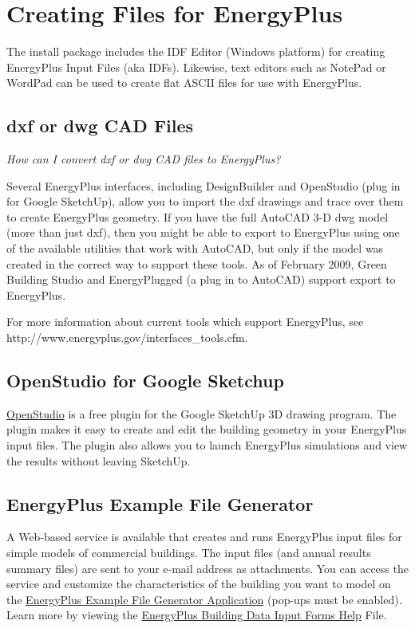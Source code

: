 \section{Creating Files for EnergyPlus}\label{creating-files-for-energyplus}

The install package includes the IDF Editor (Windows platform) for creating EnergyPlus Input Files (aka IDFs). Likewise, text editors such as NotePad or WordPad can be used to create flat ASCII files for use with EnergyPlus.

\subsection{dxf or dwg CAD Files}\label{dxf-or-dwg-cad-files}

\emph{How can I convert dxf or dwg CAD files to EnergyPlus?}

Several EnergyPlus interfaces, including DesignBuilder and OpenStudio (plug in for Google SketchUp), allow you to import the dxf drawings and trace over them to create EnergyPlus geometry. If you have the full AutoCAD 3-D dwg model (more than just dxf), then you might be able to export to EnergyPlus using one of the available utilities that work with AutoCAD, but only if the model was created in the correct way to support these tools. As of February 2009, Green Building Studio and EnergyPlugged (a plug in to AutoCAD) support export to EnergyPlus.

For more information about current tools which support EnergyPlus, see http://www.energyplus.gov/interfaces\_tools.cfm.

\subsection{OpenStudio for Google Sketchup}\label{openstudio-for-google-sketchup}

\href{http://apps1.eere.energy.gov/buildings/energyplus/openstudio.cfm}{OpenStudio} is a free plugin for the Google SketchUp 3D drawing program. The plugin makes it easy to create and edit the building geometry in your EnergyPlus input files. The plugin also allows you to launch EnergyPlus simulations and view the results without leaving SketchUp.

\subsection{EnergyPlus Example File Generator}\label{energyplus-example-file-generator}

A Web-based service is available that creates and runs EnergyPlus input files for simple models of commercial buildings. The input files (and annual results summary files) are sent to your e-mail address as attachments. You can access the service and customize the characteristics of the building you want to model on the \href{http://apps1.eere.energy.gov/buildings/energyplus/cfm/inputs/}{EnergyPlus Example File Generator Application} (pop-ups must be enabled). Learn more by viewing the \href{http://apps1.eere.energy.gov/buildings/energyplus/cfm/inputs/help.cfm}{EnergyPlus Building Data Input Forms Help} File.

